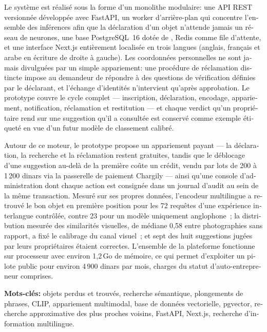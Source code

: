 \begin{otherlanguage}{french}
Le système est réalisé sous la forme d'un monolithe modulaire: une API REST
versionnée développée avec FastAPI, un worker d'arrière-plan  qui
concentre l'ensemble des inférences afin que la déclaration d'un objet
n'attende jamais un réseau de neurones, une base PostgreSQL~16 dotée de
, Redis comme file d'attente, et une interface Next.js
entièrement localisée en trois langues (anglais, français et arabe en écriture
de droite à gauche). Les coordonnées personnelles ne sont jamais divulguées par
un simple appariement: une procédure de réclamation distincte impose au
demandeur de répondre à des questions de vérification définies par le
déclarant, et l'échange d'identités n'intervient qu'après approbation. Le
prototype couvre le cycle complet --- inscription, déclaration, encodage,
appariement, notification, réclamation et restitution --- et chaque verdict
qu'un propriétaire rend sur une suggestion qu'il a consultée est conservé comme
exemple étiqueté en vue d'un futur modèle de classement calibré.

Autour de ce moteur, le prototype propose un appariement payant --- la
déclaration, la recherche et la réclamation restent gratuites, tandis que le
déblocage d'une suggestion au-delà de la première coûte un crédit, vendu par
lots de 200 à 1\,200 dinars via la passerelle de paiement Chargily --- ainsi
qu'une console d'administration dont chaque action est consignée dans un journal
d'audit au sein de la même transaction. Mesuré sur ses propres données,
l'encodeur multilingue a retrouvé le bon objet en première position pour les 72
requêtes d'une expérience interlangue contrôlée, contre 23 pour un modèle
uniquement anglophone~; la distribution mesurée des similarités visuelles, de
médiane 0{,}58 entre photographies sans rapport, a fixé le calibrage du canal
visuel~; et sept des huit suggestions jugées par leurs propriétaires étaient
correctes. L'ensemble de la plateforme fonctionne sur processeur avec environ
1{,}2\,Go de mémoire, ce qui permet d'exploiter un pilote public pour environ
4\,900 dinars par mois, charges du statut d'auto-entrepreneur comprises.

\vspace{0.8cm}
\noindent\textbf{Mots-clés:} objets perdus et trouvés, recherche sémantique,
plongements de phrases, CLIP, appariement multimodal, base de données
vectorielle, pgvector, recherche approximative des plus proches voisins,
FastAPI, Next.js, recherche d'information multilingue.
\end{otherlanguage}

